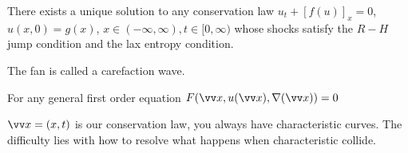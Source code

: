   \thm There exists a unique solution to any conservation law $u_t + [f(u)]_x = 0$, $u(x, 0) = g(x)$, $x \in (-\infty, \infty), t \in [0, \infty)$ whose shocks satisfy the $R-H$ jump condition and the lax entropy condition.

  \note The fan is called a carefaction wave.

  For any general first order equation $F(\vv x, u(\vv x), \grad(\vv x)) = 0$

  $\vv x = (x, t)$ is our conservation law, you always have characteristic curves. The difficulty lies with how to resolve what happens when characteristic collide.
